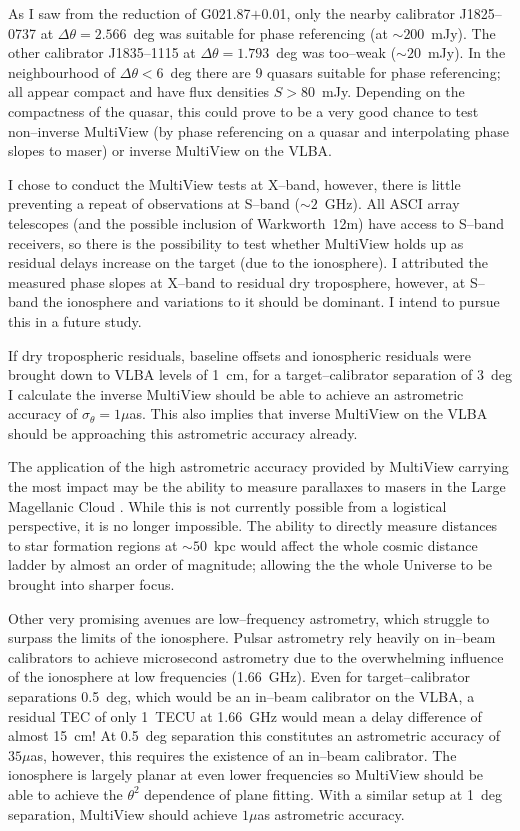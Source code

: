 	As I saw from the reduction of G021.87$+$0.01, only the nearby calibrator J1825--0737 at $\Delta\theta=2.566$~deg was suitable for phase referencing (at $\sim200$~mJy). The other calibrator J1835--1115 at $\Delta\theta=1.793$~deg was too--weak ($\sim20$~mJy). In the neighbourhood of $\Delta\theta<6$~deg there are 9 quasars suitable for phase referencing; all appear compact and have flux densities $S>80$~mJy. Depending on the compactness of the quasar, this could prove to be a very good chance to test non--inverse MultiView (by phase referencing on a quasar and interpolating phase slopes to maser) or inverse MultiView on the VLBA.
	
	I chose to conduct the MultiView tests at X--band, however, there is little preventing a repeat of observations at S--band ($\sim2$~GHz). All ASCI array telescopes (and the possible inclusion of Warkworth~12m) have access to S--band receivers, so there is the possibility to test whether MultiView holds up as residual delays increase on the target (due to the ionosphere). I attributed the measured phase slopes at X--band to residual dry troposphere, however, at S--band the ionosphere and variations to it should be dominant. I intend to pursue this in a future study.
	
	If dry tropospheric residuals, baseline offsets and ionospheric residuals were brought down to VLBA levels of 1~cm, for a target--calibrator separation of 3~deg I calculate the inverse MultiView should be able to achieve an astrometric accuracy of $\sigma_\theta=1\mu$as. This also implies that inverse MultiView on the VLBA should be approaching this astrometric accuracy already.
	
	The application of the high astrometric accuracy provided by MultiView carrying the most impact may be the ability to measure parallaxes to masers in the Large Magellanic Cloud \citep{Green2008,Green2009,Imai2013}. While this is not currently possible from a logistical perspective, it is no longer impossible. The ability to directly measure distances to star formation regions at $\sim 50$~kpc would affect the whole cosmic distance ladder by almost an order of magnitude; allowing the the whole Universe to be brought into sharper focus.
	
	Other very promising avenues are low--frequency astrometry, which struggle to surpass the limits of the ionosphere. Pulsar astrometry \citep{Deller2019} rely heavily on in--beam calibrators to achieve microsecond astrometry due to the overwhelming influence of the ionosphere at low frequencies (1.66~GHz). Even for target--calibrator separations 0.5~deg, which would be an in--beam calibrator on the VLBA, a residual TEC of only 1~TECU at 1.66~GHz would mean a delay difference of almost 15~cm! At 0.5~deg separation this constitutes an astrometric accuracy of $35\mu$as, however, this requires the existence of an in--beam calibrator. The ionosphere is largely planar at even lower frequencies \citep[$\le150$~MHz; ][ and given good weather]{Rioja2018} so MultiView should be able to achieve the $\theta^2$ dependence of plane fitting. With a similar setup at 1~deg separation, MultiView should achieve $1\mu$as astrometric accuracy.
	
